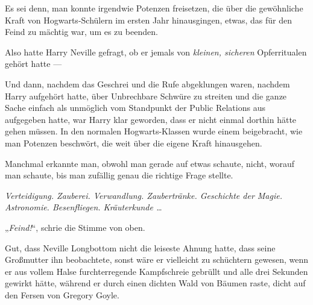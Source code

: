 Es sei denn, man konnte irgendwie Potenzen freisetzen, die über die gewöhnliche Kraft von Hogwarts-Schülern im ersten Jahr hinausgingen, etwas, das für den Feind zu mächtig war, um es zu beenden.

Also hatte Harry Neville gefragt, ob er jemals von \emph{kleinen, sicheren} Opferritualen gehört hatte —

Und dann, nachdem das Geschrei und die Rufe abgeklungen waren, nachdem Harry aufgehört hatte, über Unbrechbare Schwüre zu streiten und die ganze Sache einfach als unmöglich vom Standpunkt der Public Relations aus aufgegeben hatte, war Harry klar geworden, dass er nicht einmal dorthin hätte gehen müssen. In den normalen Hogwarts-Klassen wurde einem beigebracht, wie man Potenzen beschwört, die weit über die eigene Kraft hinausgehen.

Manchmal erkannte man, obwohl man gerade auf etwas schaute, nicht, worauf man schaute, bis man zufällig genau die richtige Frage stellte.

\emph{Verteidigung. Zauberei. Verwandlung. Zaubertränke. Geschichte der Magie. Astronomie. Besenfliegen. Kräuterkunde …}

„\emph{Feind!}“, schrie die Stimme von oben.

\later

Gut, dass Neville Longbottom nicht die leiseste Ahnung hatte, dass seine Großmutter ihn beobachtete, sonst wäre er vielleicht zu schüchtern gewesen, wenn er aus vollem Halse furchterregende Kampfschreie gebrüllt und alle drei Sekunden  gewirkt hätte, während er durch einen dichten Wald von Bäumen raste, dicht auf den Fersen von Gregory Goyle.

